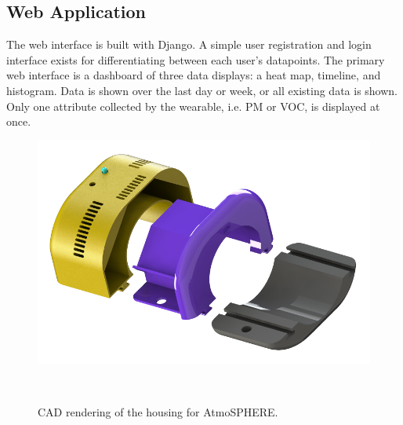 \documentclass{sigchi}
\begin{document}
\subsection{Web Application}
The web interface is built with Django.
A simple user registration and login interface exists for differentiating between each user's datapoints.
The primary web interface is a dashboard of three data displays: a heat map, timeline, and histogram.
Data is shown over the last day or week, or all existing data is shown.
Only one attribute collected by the wearable, i.e. PM or VOC, is displayed at once.
\begin{figure}
    \centering
    \includegraphics[width=0.9\columnwidth]{figures/Mechanical-Housing.png}
    \caption{CAD rendering of the housing for AtmoSPHERE.}
    ~\label{fig:housing}
\end{figure}
\end{document}

